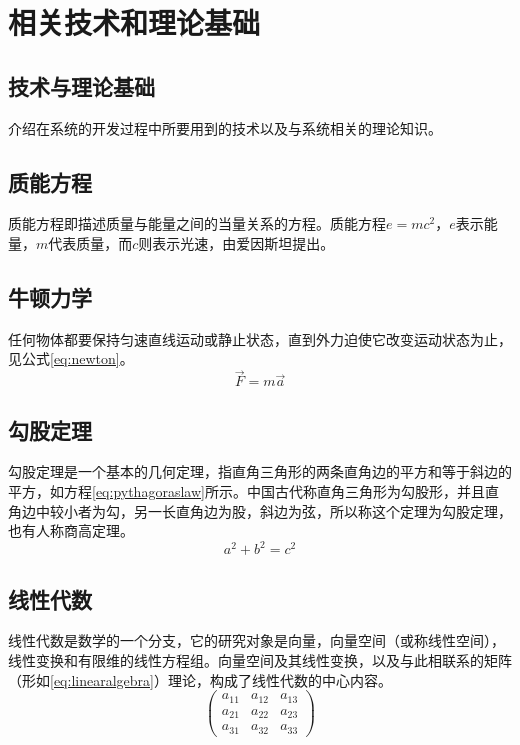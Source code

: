 
\chapter{相关技术和理论基础}

\section{技术与理论基础}
介绍在系统的开发过程中所要用到的技术\cite{timmurphy}以及与系统相关的理论知识\cite{huwei2017latex2e}。

\section{质能方程}
质能方程即描述质量与能量之间的当量关系的方程\cite{liuxiaopingwordandtex}。质能方程$e=mc^2$，$e$表示能量，$m$代表质量，而$c$则表示光速，由爱因斯坦提出\cite{yassin1994latex}。

\section{牛顿力学}
任何物体都要保持匀速直线运动或静止状态\cite{liu2013latex}，直到外力迫使它改变运动状态为止，见公式\eqref{eq:newton}。
\begin{equation}\label{eq:newton}
	\vec{F}=m\vec{a} 
\end{equation}

\section{勾股定理}
勾股定理是一个基本的几何定理，指直角三角形的两条直角边的平方和等于斜边的平方，如方程\eqref{eq:pythagoraslaw}所示。中国古代称直角三角形为勾股形，并且直角边中较小者为勾，另一长直角边为股，斜边为弦，所以称这个定理为勾股定理，也有人称商高定理\cite{he2017mask}。
\begin{equation}\label{eq:pythagoraslaw}
    a^2 + b^2 = c^2  
\end{equation}

\section{线性代数}
线性代数是数学的一个分支，它的研究对象是向量，向量空间（或称线性空间），线性变换和有限维的线性方程组。向量空间及其线性变换，以及与此相联系的矩阵（形如\eqref{eq:linearalgebra}）理论，构成了线性代数的中心内容。
\begin{equation}\label{eq:linearalgebra}
	\begin{pmatrix}
		a_{11} & a_{12} & a_{13}\\ 
		a_{21} & a_{22} & a_{23}\\  
		a_{31} & a_{32} & a_{33}   
	\end{pmatrix}  
\end{equation}

